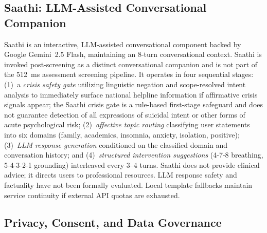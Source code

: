 \documentclass[10pt, conference, letterpaper]{IEEEtran}
\begin{document}
\subsection{Saathi: LLM-Assisted Conversational Companion}
\label{sec:saathi}

Saathi is an interactive, LLM-assisted conversational component backed by
Google Gemini~2.5 Flash, maintaining an 8-turn conversational context.
Saathi is invoked post-screening as a distinct conversational companion and is
not part of the 512~ms assessment screening pipeline.
It operates in four sequential stages:
(1)~a \textit{crisis safety gate} utilizing linguistic negation and
scope-resolved intent analysis to immediately surface national helpline
information if affirmative crisis signals appear; the Saathi crisis gate is a
rule-based first-stage safeguard and does not guarantee detection of all
expressions of suicidal intent or other forms of acute psychological risk;
(2)~\textit{affective topic routing} classifying user statements into six
domains (family, academics, insomnia, anxiety, isolation, positive);
(3)~\textit{LLM response generation} conditioned on the classified domain and
conversation history; and
(4)~\textit{structured intervention suggestions} (4-7-8 breathing, 5-4-3-2-1
grounding) interleaved every 3--4 turns.
Saathi does not provide clinical advice; it directs users to professional
resources.
LLM response safety and factuality have not been formally evaluated.
Local template fallbacks maintain service continuity if external API quotas
are exhausted.

\subsection{Privacy, Consent, and Data Governance}
\label{sec:privacy}
\end{document}

